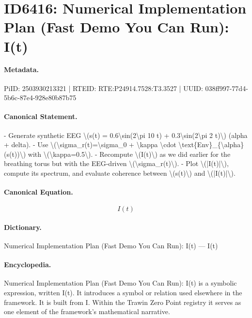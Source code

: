 \section*{ID6416: Numerical Implementation Plan (Fast Demo You Can Run): I(t)}
\paragraph{Metadata.}
PiID: 2503930213321 | RTEID: RTE:P24914.7528:T3.3527 | UUID: 038ff997-77d4-5b6c-87e4-928e80b87b75

\paragraph{Canonical Statement.}
- Generate synthetic EEG \textbackslash{}(s(t) = 0.6\textbackslash{}sin(2\textbackslash{}pi 10 t) + 0.3\textbackslash{}sin(2\textbackslash{}pi 2 t)\textbackslash{}) (alpha + delta). - Use \textbackslash{}(\textbackslash{}sigma\_r(t)=\textbackslash{}sigma\_0 + \textbackslash{}kappa \textbackslash{}cdot \textbackslash{}text\{Env\}\_\{\textbackslash{}alpha\}(s(t))\textbackslash{}) with \textbackslash{}(\textbackslash{}kappa=0.5\textbackslash{}). - Recompute \textbackslash{}(I(t)\textbackslash{}) as we did earlier for the breathing torus but with the EEG-driven \textbackslash{}(\textbackslash{}sigma\_r(t)\textbackslash{}). - Plot \textbackslash{}(|I(t)|\textbackslash{}), compute its spectrum, and evaluate coherence between \textbackslash{}(s(t)\textbackslash{}) and \textbackslash{}(|I(t)|\textbackslash{}).

\paragraph{Canonical Equation.}
\[
I(t)
\]

\paragraph{Dictionary.}
Numerical Implementation Plan (Fast Demo You Can Run): I(t) — I(t)

\paragraph{Encyclopedia.}
Numerical Implementation Plan (Fast Demo You Can Run): I(t) is a symbolic expression, written I(t). It introduces a symbol or relation used elsewhere in the framework. It is built from I. Within the Trawin Zero Point registry it serves as one element of the framework's mathematical narrative.
